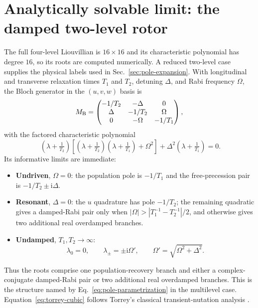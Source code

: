 \documentclass[11pt,a4paper]{article}
\newcommand{\ii}{\mathrm i}
\begin{document}
\section{Analytically solvable limit: the damped two-level rotor}
\label{sec:torrey}

The full four-level Liouvillian is $16\times16$ and its characteristic
polynomial has degree $16$, so its roots are computed numerically. A reduced
two-level case supplies the physical labels used in
Sec.~\ref{sec:pole-expansion}. With longitudinal and transverse relaxation
times $T_1$ and $T_2$, detuning $\Delta$, and Rabi frequency $\Omega$, the
Bloch generator in the $(u,v,w)$ basis is
\begin{equation}
M_{\rm B}=
\begin{pmatrix}
-1/T_2 & -\Delta & 0\\
\Delta & -1/T_2 & \Omega\\
0 & -\Omega & -1/T_1
\end{pmatrix},
\label{eq:bloch-generator}
\end{equation}
with the factored characteristic polynomial
\begin{equation}
\boxed{\;
\left(\lambda+\tfrac1{T_2}\right)
\left[\left(\lambda+\tfrac1{T_2}\right)\left(\lambda+\tfrac1{T_1}\right)
+\Omega^2\right]
+\Delta^2\left(\lambda+\tfrac1{T_1}\right)=0 .}
\label{eq:torrey-cubic}
\end{equation}
Its informative limits are immediate:
\begin{itemize}
\item \textbf{Undriven}, $\Omega=0$: the population pole is $-1/T_1$ and the
free-precession pair is $-1/T_2\pm\ii\Delta$.
\item \textbf{Resonant}, $\Delta=0$: the $u$ quadrature has pole $-1/T_2$;
the remaining quadratic gives a damped-Rabi pair only when
$|\Omega|>|T_1^{-1}-T_2^{-1}|/2$, and otherwise gives two additional real
overdamped branches.
\item \textbf{Undamped}, $T_1,T_2\to\infty$:
\begin{equation}
\lambda_0=0,\qquad
\lambda_\pm=\pm\ii\Omega',\qquad
\Omega'=\sqrt{\Omega^2+\Delta^2}.
\label{eq:generalized-rabi}
\end{equation}
\end{itemize}
Thus the roots comprise one population-recovery branch and either a
complex-conjugate damped-Rabi pair or two additional real overdamped branches.
This is the structure named by Eq.~\eqref{eq:pole-parametrization} in the
multilevel case. Equation~\eqref{eq:torrey-cubic} follows Torrey's classical
transient-nutation analysis \cite{Torrey1949}.
\end{document}
